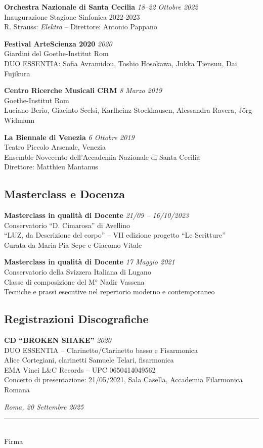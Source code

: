 \documentclass[11pt,a4paper]{article}
\newcommand{\cvevent}[3]{%
    \textbf{#1} \hfill \textit{#2}\\
    #3\vspace{0.3em}
}
\begin{document}
\cvevent{Orchestra Nazionale di Santa Cecilia}{18--22 Ottobre 2022}
{Inaugurazione Stagione Sinfonica 2022-2023\\
R. Strauss: \textit{Elektra} -- Direttore: Antonio Pappano}

\cvevent{Festival ArteScienza 2020}{2020}
{Giardini del Goethe-Institut Rom\\
DUO ESSENTIA: Sofia Avramidou, Toshio Hosokawa, Jukka Tiensuu, Dai Fujikura}

\cvevent{Centro Ricerche Musicali CRM}{8 Marzo 2019}
{Goethe-Institut Rom\\
Luciano Berio, Giacinto Scelsi, Karlheinz Stockhausen, Alessandra Ravera, Jörg Widmann}

\cvevent{La Biennale di Venezia}{6 Ottobre 2019}
{Teatro Piccolo Arsenale, Venezia\\
Ensemble Novecento dell'Accademia Nazionale di Santa Cecilia\\
Direttore: Matthieu Mantanus}

\subsection{Masterclass e Docenza}

\cvevent{Masterclass in qualità di Docente}{21/09 -- 16/10/2023}
{Conservatorio ``D. Cimarosa'' di Avellino\\
``LUZ, da Descrizione del corpo'' -- VII edizione progetto ``Le Scritture''\\
Curata da Maria Pia Sepe e Giacomo Vitale}

\cvevent{Masterclass in qualità di Docente}{17 Maggio 2021}
{Conservatorio della Svizzera Italiana di Lugano\\
Classe di composizione del M° Nadir Vassena\\
Tecniche e prassi esecutive nel repertorio moderno e contemporaneo}

\subsection{Registrazioni Discografiche}

\cvevent{CD ``BROKEN SHAKE''}{2020}
{DUO ESSENTIA -- Clarinetto/Clarinetto basso e Fisarmonica\\
Alice Cortegiani, clarinetti \quad Samuele Telari, fisarmonica\\
EMA Vinci L\&C Records -- UPC 0650414049562\\
Concerto di presentazione: 21/05/2021, Sala Casella, Accademia Filarmonica Romana}




\vfill
\begin{flushright}
    \textit{Roma, 20 Settembre 2025}\\[0.5em]
    \rule{4cm}{0.4pt}\\
    Firma
\end{flushright}
\end{document}
